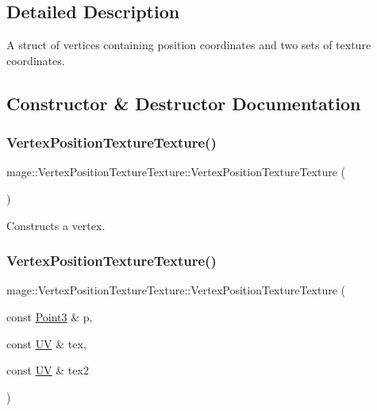 \subsection{Detailed Description}
A struct of vertices containing position coordinates and two sets of texture coordinates. 

\subsection{Constructor \& Destructor Documentation}
\hypertarget{structmage_1_1_vertex_position_texture_texture_a4dd987362b64d278569f9bd043e2cb8b}{}\label{structmage_1_1_vertex_position_texture_texture_a4dd987362b64d278569f9bd043e2cb8b} 
\subsubsection{\texorpdfstring{Vertex\+Position\+Texture\+Texture()}{VertexPositionTextureTexture()}\hspace{0.1cm}{\footnotesize\ttfamily [1/4]}}
{\footnotesize\ttfamily mage\+::\+Vertex\+Position\+Texture\+Texture\+::\+Vertex\+Position\+Texture\+Texture (\begin{DoxyParamCaption}{ }\end{DoxyParamCaption})\hspace{0.3cm}{\ttfamily [default]}}

Constructs a vertex. \hypertarget{structmage_1_1_vertex_position_texture_texture_ad96c9fb6a486b92aeeccb8e7e3da2a3a}{}\label{structmage_1_1_vertex_position_texture_texture_ad96c9fb6a486b92aeeccb8e7e3da2a3a} 
\subsubsection{\texorpdfstring{Vertex\+Position\+Texture\+Texture()}{VertexPositionTextureTexture()}\hspace{0.1cm}{\footnotesize\ttfamily [2/4]}}
{\footnotesize\ttfamily mage\+::\+Vertex\+Position\+Texture\+Texture\+::\+Vertex\+Position\+Texture\+Texture (\begin{DoxyParamCaption}\item[{const \hyperlink{structmage_1_1_point3}{Point3} \&}]{p,  }\item[{const \hyperlink{structmage_1_1_u_v}{UV} \&}]{tex,  }\item[{const \hyperlink{structmage_1_1_u_v}{UV} \&}]{tex2 }\end{DoxyParamCaption})\hspace{0.3cm}{\ttfamily [explicit]}}

